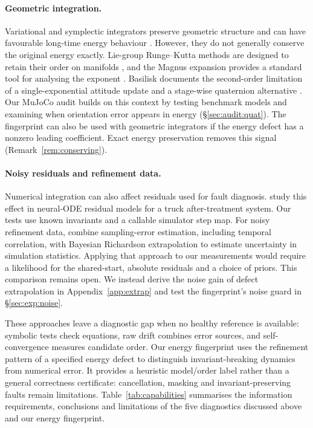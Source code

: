 \documentclass[10pt]{article}
\theoremstyle{definition}
\begin{document}
\paragraph{Geometric integration.}
Variational and symplectic integrators preserve geometric structure and can
have favourable long-time energy behaviour
\citep{marsden2001,hairer2006geometric}. However, they do not generally
conserve the original energy exactly. Lie-group Runge--Kutta methods are
designed to retain their order on manifolds
\citep{crouch1993,munthekaas1998,celledoni2003}, and the Magnus expansion
provides a standard tool for analysing the exponent \citep{blanes2009}.
Basilisk documents the second-order limitation of a single-exponential
attitude update and a stage-wise quaternion alternative
\citep{basiliskmjscene}. Our MuJoCo audit builds on this context by testing
benchmark models and examining when orientation error appears in energy
(\S\ref{sec:audit:quat}). The fingerprint can also be used with geometric
integrators if the energy defect has a nonzero leading coefficient. Exact
energy preservation removes this signal (Remark~\ref{rem:conserving}).

\paragraph{Noisy residuals and refinement data.}
Numerical integration can also affect residuals used for fault diagnosis.
\citet{mohammadi2023} study this effect in neural-ODE residual models for a
truck after-treatment system. Our tests use known invariants and a callable
simulator step map. For noisy refinement data, \citet{oliver2014} combine
sampling-error estimation, including temporal correlation, with Bayesian
Richardson extrapolation to estimate uncertainty in simulation statistics.
Applying that approach to our measurements would require a likelihood for
the shared-start, absolute residuals and a choice of priors. This comparison
remains open. We instead derive the noise gain of defect extrapolation in
Appendix~\ref{app:extrap} and test the fingerprint's noise guard in
\S\ref{sec:exp:noise}.

These approaches leave a diagnostic gap when no healthy reference is
available: symbolic tests check equations, raw drift combines error sources,
and self-convergence measures candidate order. Our energy fingerprint uses the
refinement pattern of a specified energy defect to distinguish
invariant-breaking dynamics from numerical error. It provides a heuristic
model/order label rather than a general correctness certificate: cancellation,
masking and invariant-preserving faults remain limitations.
Table~\ref{tab:capabilities} summarises the information requirements,
conclusions and limitations of the five diagnostics discussed above and our
energy fingerprint.
\end{document}
